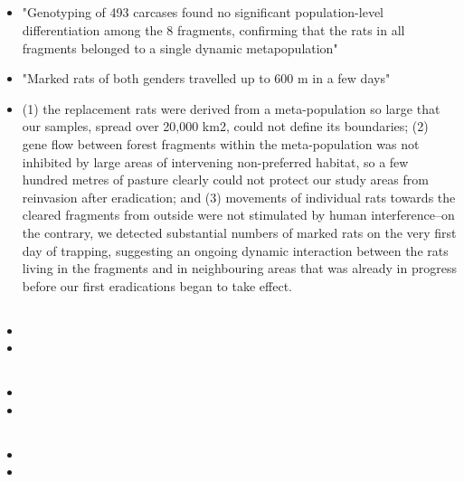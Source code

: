 \documentclass[document.tex]{subfiles}
\begin{document}
    \subsection{}
    \begin{itemize}
    \item "Genotyping of 493 carcases found no significant population-level differentiation among the 8 fragments, confirming that the rats in all fragments belonged to a single dynamic metapopulation"
    \item "Marked rats of both genders travelled up to 600 m in a few days"
    \item (1) the replacement rats were derived from a meta-population so large that our samples, spread over 20,000 km2, could not define its boundaries; (2) gene flow between forest fragments within the meta-population was not inhibited by large areas of intervening non-preferred habitat, so a few hundred metres of pasture clearly could not protect our study areas from reinvasion after eradication; and (3) movements of individual rats towards the cleared fragments from outside were not stimulated by human interference–on the contrary, we detected substantial numbers of marked rats on the very first day of trapping, suggesting an ongoing dynamic interaction between the rats living in the fragments and in neighbouring areas that was already in progress before our first eradications began to take effect.
    \end{itemize}

    \subsection{}
    \begin{itemize}
    \item 
    \item 
    \end{itemize}

    \subsection{}
    \begin{itemize}
    \item 
    \item 
    \end{itemize}

    \subsection{\citetitle{}}
    \begin{itemize}
    \item 
    \item 
    \end{itemize}
\end{document}

